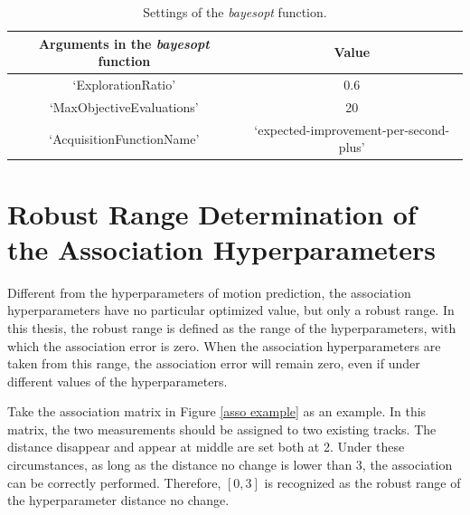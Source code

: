 \begin{table}[htbp] 
    \centering
    \caption{Settings of the \textit{bayesopt} function.} 
    \begin{tabular}{cc} 
    \toprule 
    Arguments in the \textit{bayesopt} function&Value\\ 
    \midrule 
    \textquoteleft ExplorationRatio\textquoteright           &0.6\\
    \textquoteleft MaxObjectiveEvaluations\textquoteright    &20\\
    \textquoteleft AcquisitionFunctionName\textquoteright    &\textquoteleft expected-improvement-per-second-plus\textquoteright\\
    \bottomrule 
    \end{tabular} 
    \label{bayopt setting}
\end{table}





\section{Robust Range Determination of the Association Hyperparameters}

\label{Robust Range of the Association Hyperparameters}

Different from the hyperparameters of motion prediction, the association hyperparameters have no particular optimized value, but only a robust range. In this thesis, the robust range is defined as the range of the hyperparameters, with which the association error is zero. When the association hyperparameters are taken from this range, the association error will remain zero, even if under different values of the hyperparameters.

Take the association matrix in Figure \ref{asso example} as an example. In this matrix, the two measurements should be assigned to two existing tracks. The distance disappear and appear at middle are set both at 2. Under these circumstances, as long as the distance no change is lower than 3, the association can be correctly performed. Therefore, $[0,3]$ is recognized as the robust range of the hyperparameter distance no change.

